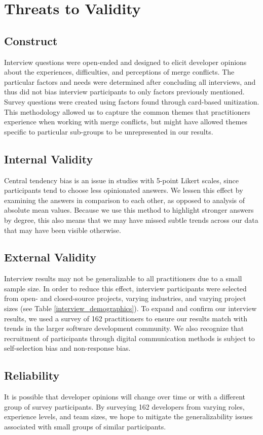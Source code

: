 \section{Threats to Validity}\label{threats}
\subsection{Construct}
Interview questions were open-ended and designed to elicit developer opinions about the experiences, difficulties, and perceptions of merge conflicts.
The particular factors and needs were determined after concluding all interviews, and thus did not bias interview participants to only factors previously mentioned.
Survey questions were created using factors found through card-based unitization.
This methodology allowed us to capture the common themes that practitioners experience when working with merge conflicts, but might have allowed themes specific to particular sub-groups to be unrepresented in our results.
\subsection{Internal Validity}
Central tendency bias \cite{guilford1954psychometric} is an issue in studies with 5-point Likert scales, since participants tend to choose less opinionated answers.
We lessen this effect by examining the answers in comparison to each other, as opposed to analysis of absolute mean values.
Because we use this method to highlight stronger answers by degree, this also means that we may have missed subtle trends across our data that may have been visible otherwise.

\subsection{External Validity}
Interview results may not be generalizable to all practitioners due to a small sample size.
In order to reduce this effect, interview participants were selected from open- and closed-source projects, varying industries, and varying project sizes (see Table \ref{interview_demographics}).
To expand and confirm our interview results, we used a survey of 162 practitioners to ensure our results match with trends in the larger software development community.
We also recognize that recruitment of participants through digital communication methods is subject to self-selection bias and non-response bias.

\subsection{Reliability}
It is possible that developer opinions will change over time or with a different group of survey participants. By surveying 162 developers from varying roles, experience levels, and team sizes, we hope to mitigate the generalizability issues associated with small groups of similar participants.

